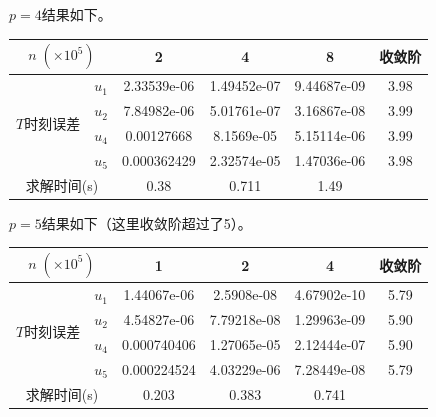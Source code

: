 \documentclass[lang=cn,10pt,bibend=bibtex]{elegantbook}
\begin{document}
$p=4$结果如下。

\vspace{-.5em}
\begin{table}[H]
  \centering
  \renewcommand\arraystretch{0.8}
  \begin{tabular}{cc|ccc|c}
  \multicolumn{2}{c|}{$n\;(\times 10^5)$}                  & 2 & 4 & 8  & 收敛阶 \\ \hline
  \multicolumn{1}{c|}{\multirow{4}{*}{$T$时刻误差}} & \multicolumn{1}{c|}{$u_1$} &  2.33539e-06  &  1.49452e-07  & 9.44687e-09    &  3.98   \\
  \multicolumn{1}{c|}{}                         & \multicolumn{1}{c|}{$u_2$} &   7.84982e-06    & 5.01761e-07  & 3.16867e-08    &  3.99   \\
  \multicolumn{1}{c|}{}                         & \multicolumn{1}{c|}{$u_4$} &   0.00127668    & 8.1569e-05  & 5.15114e-06     &  3.99   \\
  \multicolumn{1}{c|}{}                         & \multicolumn{1}{c|}{$u_5$} &   0.000362429   & 2.32574e-05  & 1.47036e-06     &  3.98  \\ \hline
  \multicolumn{2}{c|}{求解时间(s)} & 0.38 & 0.711 & 1.49 & 
  \end{tabular}
\end{table}
\vspace{-.8em}

$p=5$结果如下（这里收敛阶超过了5）。

\vspace{-.5em}
\begin{table}[H]
  \centering
  \renewcommand\arraystretch{0.8}
  \begin{tabular}{cc|ccc|c}
  \multicolumn{2}{c|}{$n\;(\times 10^5)$}                  & 1 & 2 & 4  & 收敛阶 \\ \hline
  \multicolumn{1}{c|}{\multirow{4}{*}{$T$时刻误差}} & \multicolumn{1}{c|}{$u_1$} &  1.44067e-06  &  2.5908e-08  & 4.67902e-10    &  5.79   \\
  \multicolumn{1}{c|}{}                         & \multicolumn{1}{c|}{$u_2$} &   4.54827e-06    & 7.79218e-08  & 1.29963e-09    &  5.90   \\
  \multicolumn{1}{c|}{}                         & \multicolumn{1}{c|}{$u_4$} &   0.000740406    & 1.27065e-05  & 2.12444e-07     & 5.90   \\
  \multicolumn{1}{c|}{}                         & \multicolumn{1}{c|}{$u_5$} &   0.000224524   & 4.03229e-06  & 7.28449e-08     & 5.79  \\ \hline
  \multicolumn{2}{c|}{求解时间(s)} & 0.203 & 0.383 & 0.741 & 
  \end{tabular}
\end{table}
\vspace{-.8em}
\end{document}
